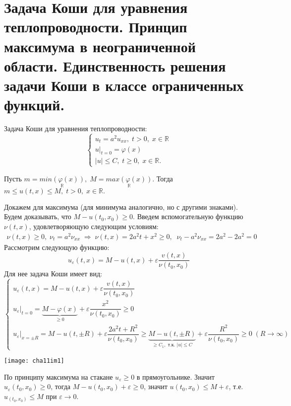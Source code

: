 \chapter{Задача Коши для уравнения теплопроводности. Принцип максимума в неограниченной области. Единственность решения задачи Коши в классе ограниченных функций.}
\label{cha:11}

Задача Коши для уравнения теплопроводности:
$$\begin{cases}
	u_{t} = a^2 u_{xx}, \; t > 0, \; x \in \mathbb{R}\\
	u|_{t = 0} = \varphi (x) \\
	|u| \leq C, \; t \geq 0, \; x \in \mathbb{R}.
\end{cases}$$

\begin{theorem} 
Пусть $ m = \underset{\mathbb{R}}{min(\varphi(x))}, \; M = \underset{\mathbb{R}}{max(\varphi(x))}$. Тогда $m \leq u(t, x) \leq M, \; t > 0, 
\; x \in \mathbb{R}.$
\end{theorem}

\begin{Proof}
Докажем для максимума (для минимума аналогично, но с другими знаками).\\

Будем доказывать, что $ M - u(t_0, x_0) \ge 0. $ Введем вспомогательную функцию $\nu(t,x)$, удовлетворяющую следующим условиям:
$$\begin{gathered}
	\nu(t, x) \ge 0, \; \nu_t = a^2\nu_{xx} \; \Rightarrow \; 
	\nu(t, x) = 2a^2t + x^2 \ge 0 , \;\; 
	\nu_t - a^2\nu_{xx} = 2a^2 - 2a^2 = 0
\end{gathered}$$
Рассмотрим следующую функцию:
$$u_\varepsilon(t, x) = M - u(t, x ) + \varepsilon\dfrac{v(t,x)}{\nu(t_0, x_0)}$$
Для нее задача Коши имеет вид:
$$\begin{cases}
	u_\varepsilon(t, x) = M - u(t, x ) + \varepsilon\dfrac{v(t,x)}{\nu(t_0, x_0)} \\
	u_\varepsilon|_{t = 0} = \underset{\ge 0}{\underbrace{M - \varphi(x)}} + \varepsilon\dfrac{x^2}{\nu(t_0, x_0)} \ge 0 \\
	u_\varepsilon|_{x = \pm R} = M - u(t, \pm R) + \varepsilon\dfrac{2a^2t + R^2}{\nu(t_0, x_0)} \ge \underbrace{M - u(t, \pm R)}_{\ge C_1, \text{ т.к. } |u| \leq C} + \varepsilon\dfrac{R^2}{\nu(t_0, x_0)} \geq 0 \;(R \rightarrow \infty)
\end{cases}$$

\begin{center}
\texttt{[image: cha11im1]}
\end{center}

По принципу максимума на стакане $ u_\varepsilon \geq 0 $ в прямоугольнике. Значит $u_\varepsilon(t_0, x_0) \ge 0$, тогда $M - u(t_0, x_0) + \varepsilon \ge 0$, значит $u(t_0, x_0) \le M + \varepsilon$, т.е. $u_(t_0, x_0) \le M$ при $\varepsilon \longrightarrow 0$.

\end{Proof}

